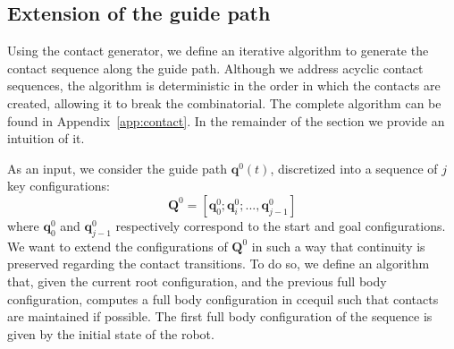 \subsection{Extension of the guide path}
Using the contact generator, we define an iterative algorithm to generate the contact
sequence along the guide path.
Although we address acyclic contact sequences, the algorithm is deterministic in the order in which 
the contacts are created, allowing it to break the combinatorial.
The complete algorithm can be found in Appendix~\ref{app:contact}.
In the remainder of the section we provide an intuition of it.

As an input, we consider the guide path $\mathbf{q}^0(t)$, discretized into a sequence of $j$ key configurations:  
\begin{equation*}
	\mathbf{Q}^0 = [\mathbf{q}^0_{0}; \mathbf{q}^0_{i}; ..., \mathbf{q}^0_{j-1}]
\end{equation*} 
where $\mathbf{q}^0_{0}$ and $\mathbf{q}^0_{j-1}$ respectively correspond to the start and goal configurations. %
We want to extend the configurations of $\mathbf{Q}^0$ in such a way that continuity is preserved regarding the contact transitions.
To do so, we define an algorithm that, given the current root configuration, and the previous full body configuration, computes a full body configuration 
in \gls{ccequil} such that contacts are maintained if possible.
The first full body configuration of the sequence is given by the initial state of the robot.


